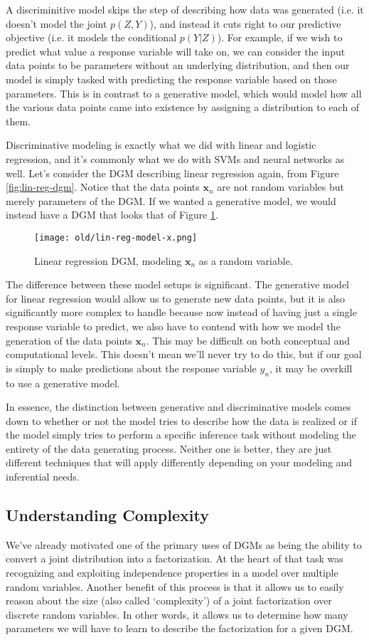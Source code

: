 A discriminitive model skips the step of describing how data was generated (i.e. it doesn't model the joint $p(Z, Y)$), and instead it cuts right to our predictive objective (i.e. it models the conditional $p(Y|Z)$). For example, if we wish to predict what value a response variable will take on, we can consider the input data points to be parameters without an underlying distribution, and then our model is simply tasked with predicting the response variable based on those parameters. This is in contrast to a generative model, which would model how all the various data points came into existence by assigning a distribution to each of them.

Discriminative modeling is exactly what we did with linear and logistic regression, and it's commonly what we do with SVMs and neural networks as well. Let's consider the DGM describing linear regression again, from Figure \ref{fig:lin-reg-dgm}. Notice that the data points $\textbf{x}_n$ are not random variables but merely parameters of the DGM. If we wanted a generative model, we would instead have a DGM that looks that of Figure \ref{fig:lin-reg-model-x}.
\begin{figure}
	\centering
	\texttt{[image: old/lin-reg-model-x.png]}
    \caption{Linear regression DGM, modeling $\textbf{x}_n$ as a random variable.}
	\label{fig:lin-reg-model-x}
\end{figure}

The difference between these model setups is significant. The generative model for linear regression would allow us to generate new data points, but it is also significantly more complex to handle because now instead of having just a single response variable to predict, we also have to contend with how we model the generation of the data points $\textbf{x}_n$. This may be difficult on both conceptual and computational levels. This doesn't mean we'll never try to do this, but if our goal is simply to make predictions about the response variable $y_n$, it may be overkill to use a generative model.

In essence, the distinction between generative and discriminative models comes down to whether or not the model tries to describe how the data is realized or if the model simply tries to perform a specific inference task without modeling the entirety of the data generating process. Neither one is better, they are just different techniques that will apply differently depending on your modeling and inferential needs.

\subsection{Understanding Complexity}
We've already motivated one of the primary uses of DGMs as being the ability to convert a joint distribution into a factorization. At the heart of that task was recognizing and exploiting independence properties in a model over multiple random variables. Another benefit of this process is that it allows us to easily reason about the size (also called `complexity') of a joint factorization over discrete random variables. In other words, it allows us to determine how many parameters we will have to learn to describe the factorization for a given DGM.

